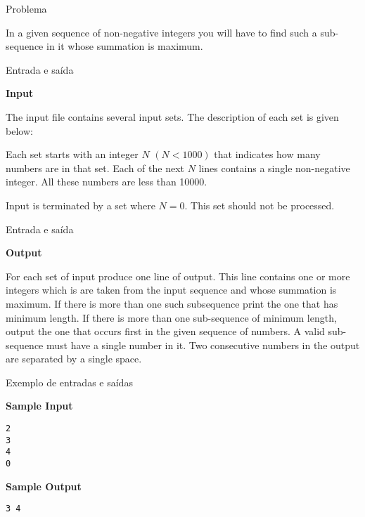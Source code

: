
\begin{frame}[fragile]{Problema}

In a given sequence of non-negative integers you will have to find such a sub-sequence in it whose
summation is maximum.

\end{frame}

\begin{frame}[fragile]{Entrada e saída}

\textbf{Input}

The input file contains several input sets. The description of each set is given below:

Each set starts with an integer $N$ $(N < 1000)$ that indicates how many numbers are in that set.
Each of the next $N$ lines contains a single non-negative integer. All these numbers are less 
than 10000.

Input is terminated by a set where $N = 0$. This set should not be processed.

\end{frame}

\begin{frame}[fragile]{Entrada e saída}

\textbf{Output}

For each set of input produce one line of output. This line contains one or more integers which is are
taken from the input sequence and whose summation is maximum. If there is more than one such subsequence print the one that has minimum length. If there is more than one sub-sequence of minimum
length, output the one that occurs first in the given sequence of numbers. A valid sub-sequence must
have a single number in it. Two consecutive numbers in the output are separated by a single space.

\end{frame}


\begin{frame}[fragile]{Exemplo de entradas e saídas}

\begin{minipage}[t]{0.6\textwidth}
\textbf{Sample Input}
\begin{verbatim}
2
3
4
0
\end{verbatim}
\end{minipage}
\begin{minipage}[t]{0.35\textwidth}
\textbf{Sample Output}
\begin{verbatim}
3 4
\end{verbatim}
\end{minipage}
\end{frame}

